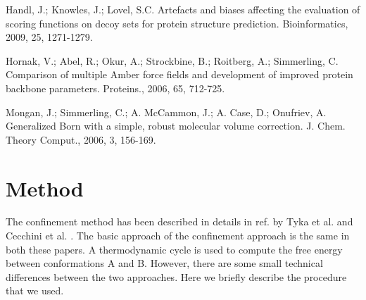 Handl, J.; Knowles, J.; Lovel, S.C. Artefacts and biases affecting the evaluation of scoring 
functions on decoy sets for protein structure prediction. Bioinformatics, 2009, 25, 1271-1279.

Hornak, V.; Abel, R.; Okur, A.; Strockbine, B.; Roitberg, A.; Simmerling, C. Comparison of multiple Amber force fields 
and development of improved protein backbone parameters. Proteins., 2006, 65, 712-725.

Mongan, J.; Simmerling, C.; A. McCammon, J.; A. Case, D.; Onufriev, A. Generalized
Born with a simple, robust molecular volume correction. J. Chem. Theory Comput.,
2006, 3, 156-169.

\section{Method}

The confinement method has been described in details in ref. by Tyka et al. \cite{Tyka2006} and
Cecchini et  al. \cite{Cecchini2009}. The basic approach of the confinement approach is the same in
both these papers. A thermodynamic cycle is used to compute the free energy between conformations A 
and B. However, there are some small technical differences between the two approaches. Here we briefly 
describe the procedure that we used. 


